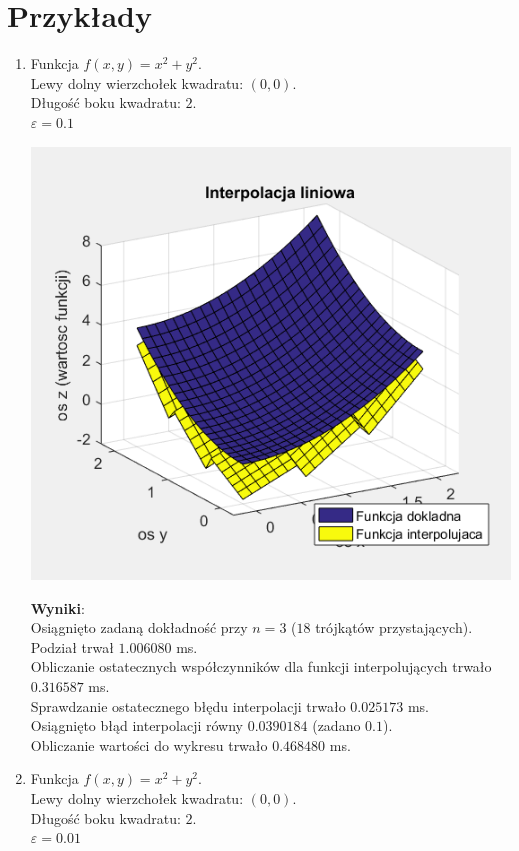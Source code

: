 \documentclass[12pt]{article}
\begin{document}
	\section{Przykłady}
	\begin{enumerate}[label=\textbf{Przykład \arabic*}]
		\item
		Funkcja $f(x, y) = x^2 + y^2$.\\
		Lewy dolny wierzchołek kwadratu: $(0, 0)$.\\
		Długość boku kwadratu: $2$.\\
		$\varepsilon = 0.1$
		
		\includegraphics[]{images/example-1.png}
		
		\textbf{Wyniki}:\\
		Osiągnięto zadaną dokładność przy $n = 3$ ($18$ trójkątów przystających).\\
		Podział trwał $1.006080$ ms.\\
		Obliczanie ostatecznych współczynników dla funkcji interpolujących trwało $0.316587$ ms.\\
		Sprawdzanie ostatecznego błędu interpolacji trwało $0.025173$ ms.\\
		Osiągnięto błąd interpolacji równy $0.0390184$ (zadano $0.1$).\\
		Obliczanie wartości do wykresu trwało $0.468480$ ms.
		
		
		
		\item
		Funkcja $f(x, y) = x^2 + y^2$.\\
		Lewy dolny wierzchołek kwadratu: $(0, 0)$.\\
		Długość boku kwadratu: $2$.\\
		$\varepsilon = 0.01$
		

\end{enumerate}
\end{document}

